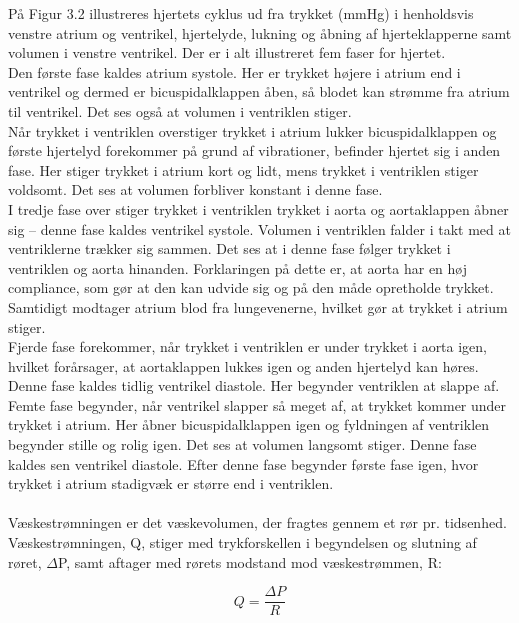 På Figur 3.2 illustreres hjertets cyklus ud fra trykket (mmHg) i henholdsvis venstre atrium og ventrikel, hjertelyde, lukning og åbning af hjerteklapperne samt volumen i venstre ventrikel. Der er i alt illustreret fem faser for hjertet. \\
Den første fase kaldes atrium systole. Her er trykket højere i atrium end i ventrikel og dermed er bicuspidalklappen åben, så blodet kan strømme fra atrium til ventrikel. Det ses også at volumen i ventriklen stiger. \\
Når trykket i ventriklen overstiger trykket i atrium lukker bicuspidalklappen og første hjertelyd forekommer på grund af vibrationer, befinder hjertet sig i anden fase. Her stiger trykket i atrium kort og lidt, mens trykket i ventriklen stiger voldsomt. Det ses at volumen forbliver konstant i denne fase. \\
I tredje fase over stiger trykket i ventriklen trykket i aorta og aortaklappen åbner sig – denne fase kaldes ventrikel systole. Volumen i ventriklen falder i takt med at ventriklerne trækker sig sammen. Det ses at i denne fase følger trykket i ventriklen og aorta hinanden. Forklaringen på dette er, at aorta har en høj compliance, som gør at den kan udvide sig og på den måde opretholde trykket. Samtidigt modtager atrium blod fra lungevenerne, hvilket gør at trykket i atrium stiger. \\
Fjerde fase forekommer, når trykket i ventriklen er under trykket i aorta igen, hvilket forårsager, at aortaklappen lukkes igen og anden hjertelyd kan høres. Denne fase kaldes tidlig ventrikel diastole. Her begynder ventriklen at slappe af. \\
Femte fase begynder, når ventrikel slapper så meget af, at trykket kommer under trykket i atrium. Her åbner bicuspidalklappen igen og fyldningen af ventriklen begynder stille og rolig igen. Det ses at volumen langsomt stiger. Denne fase kaldes sen ventrikel diastole. Efter denne fase begynder første fase igen, hvor trykket i atrium stadigvæk er større end i ventriklen. 
\\\\
Væskestrømningen er det væskevolumen, der fragtes gennem et rør pr. tidsenhed. Væskestrømningen, Q, stiger med trykforskellen i begyndelsen og slutning af røret, $\Delta$P, samt aftager med rørets modstand mod væskestrømmen, R: 

\begin{equation}
Q = \frac{\Delta P}{R}
\end{equation}

